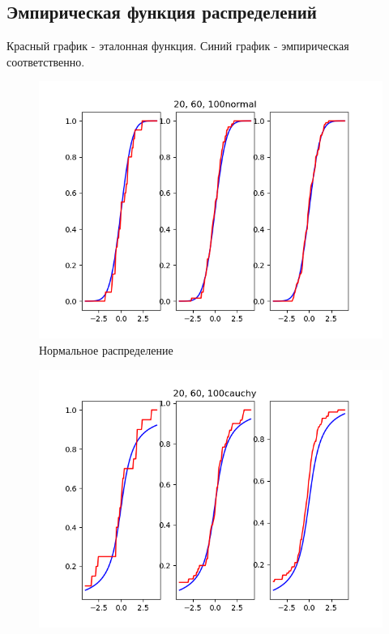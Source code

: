 \documentclass[a4]{article}
\begin{document}
			\newpage
		
		\subsection{Эмпирическая функция распределений}
		Красный график - эталонная функция. Синий график - эмпирическая соответственно.
		\begin{center}
			
			\begin{figure}[h!]
				\includegraphics[width=\textwidth]{normalemp.png} 
				\caption[Нормальное распределение]{Нормальное распределение}
			\end{figure}
			\newpage
			\begin{figure}[h!]
				\includegraphics[width=\textwidth]{cauchyemp.png}

\end{figure}
\end{center}
\end{document}
